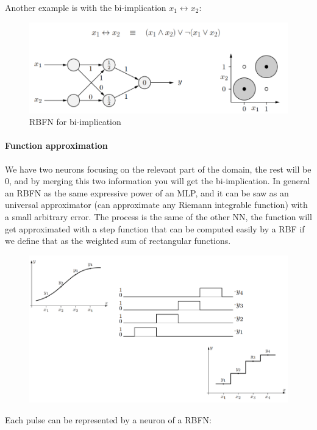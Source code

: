 \documentclass{article}
\begin{document}
Another example is with the bi-implication $x_1\longleftrightarrow x_2$:
\begin{figure}[H]
    \centering
    \includegraphics[scale=0.4]{images/RBFN_bi.png}
    \caption{RBFN for bi-implication}
\end{figure}

\paragraph{Function approximation}
We have two neurons focusing on the relevant part of the domain, the rest will be $0$, and by merging
this two information you will get the bi-implication. In general an RBFN as the same expressive
power of an MLP, and it can be saw as an universal approximator (can approximate any Riemann integrable
function) with a small arbitrary error.
\newline\newline
The process is the same of the other NN, the function will get approximated with a step function that
can be computed easily by a RBF if we define that as the weighted sum of rectangular functions.
\begin{figure}[H]
    \centering
    \includegraphics[scale=0.4]{images/scale_func.png}
\end{figure}
Each pulse can be represented by a neuron of a RBFN:
\end{document}
